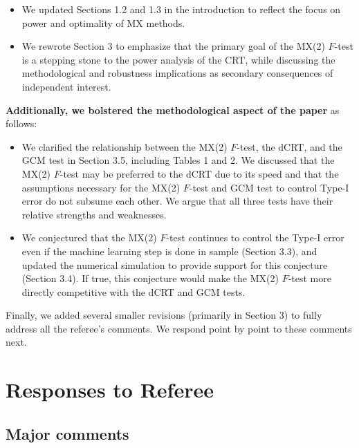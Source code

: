 \documentclass[12pt]{article}
\begin{document}
\begin{itemize}
	\item We updated Sections 1.2 and 1.3 in the introduction to reflect the focus on power and optimality of MX methods.
	\item We rewrote Section 3 to emphasize that the primary goal of the MX(2) $F$-test is a stepping stone to the power analysis of the CRT, while discussing the methodological and robustness implications as secondary consequences of independent interest.
\end{itemize}
\noindent
\textbf{Additionally, we bolstered the methodological aspect of the paper} as follows:
\begin{itemize}
	\item We clarified the relationship between the MX(2) $F$-test, the dCRT, and the GCM test in Section 3.5, including Tables 1 and 2. We discussed that the MX(2) $F$-test may be preferred to the dCRT due to its speed and that the assumptions necessary for the MX(2) $F$-test and GCM test to control Type-I error do not subsume each other. We argue that all three tests have their relative strengths and weaknesses.
	\item We conjectured that the MX(2) $F$-test continues to control the Type-I error even if the machine learning step is done in sample (Section 3.3), and updated the numerical simulation to provide support for this conjecture (Section 3.4). If true, this conjecture would make the MX(2) $F$-test more directly competitive with the dCRT and GCM tests.
\end{itemize}
\noindent 
Finally, we added several smaller revisions (primarily in Section 3) to fully address all the referee's comments. We respond point by point to these comments next.

\section{Responses to Referee}

\subsection{Major comments}
\end{document}
